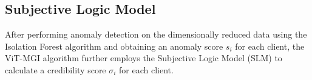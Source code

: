 \documentclass[conference]{IEEEtran}
\begin{document}
\subsection{Subjective Logic Model}
\label{sec:method_subjective}


After performing anomaly detection on the dimensionally reduced data using the Isolation Forest algorithm and obtaining an anomaly score $s_i$ for each client, the ViT-MGI algorithm further employs the Subjective Logic Model (SLM) to calculate a credibility score $\sigma_i$ for each client.







\end{document}
